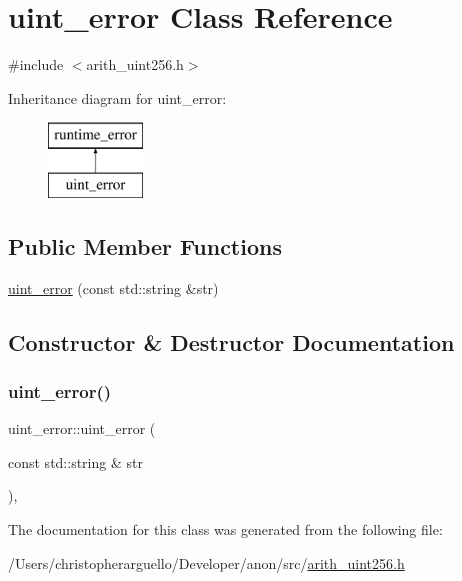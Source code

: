 \hypertarget{classuint__error}{}\section{uint\+\_\+error Class Reference}
\label{classuint__error}


{\ttfamily \#include $<$arith\+\_\+uint256.\+h$>$}

Inheritance diagram for uint\+\_\+error\+:\begin{figure}[H]
\begin{center}
\leavevmode
\includegraphics[height=2.000000cm]{classuint__error}
\end{center}
\end{figure}
\subsection*{Public Member Functions}
\begin{DoxyCompactItemize}
\item 
\mbox{\hyperlink{classuint__error_a3d37e73d7d585ede158ebba7d32352c3}{uint\+\_\+error}} (const std\+::string \&str)
\end{DoxyCompactItemize}


\subsection{Constructor \& Destructor Documentation}
\mbox{\label{classuint__error_a3d37e73d7d585ede158ebba7d32352c3}} 
\subsubsection{\texorpdfstring{uint\+\_\+error()}{uint\_error()}}
{\footnotesize\ttfamily uint\+\_\+error\+::uint\+\_\+error (\begin{DoxyParamCaption}\item[{const std\+::string \&}]{str }\end{DoxyParamCaption})\hspace{0.3cm}{\ttfamily [inline]}, {\ttfamily [explicit]}}



The documentation for this class was generated from the following file\+:\begin{DoxyCompactItemize}
\item 
/\+Users/christopherarguello/\+Developer/anon/src/\mbox{\hyperlink{arith__uint256_8h}{arith\+\_\+uint256.\+h}}\end{DoxyCompactItemize}
